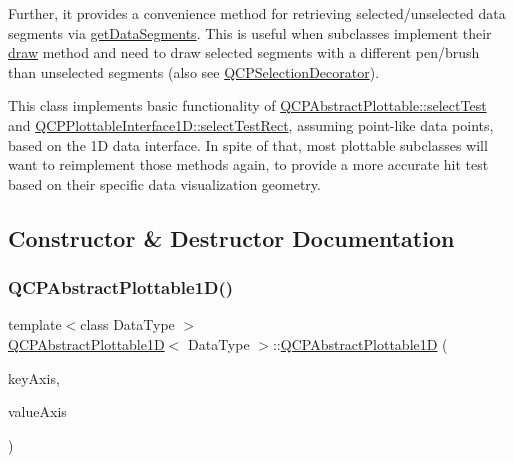 Further, it provides a convenience method for retrieving selected/unselected data segments via \mbox{\hyperlink{class_q_c_p_abstract_plottable1_d_ae890e62ce403c54f575c73b9529f1af8}{get\+Data\+Segments}}. This is useful when subclasses implement their \mbox{\hyperlink{class_q_c_p_abstract_plottable_a453f676a5cee7bf846c5f0fa05ea84b3}{draw}} method and need to draw selected segments with a different pen/brush than unselected segments (also see \mbox{\hyperlink{class_q_c_p_selection_decorator}{Q\+C\+P\+Selection\+Decorator}}).

This class implements basic functionality of \mbox{\hyperlink{class_q_c_p_abstract_plottable_addb3f5c41f007a78c3e142cc605bc712}{Q\+C\+P\+Abstract\+Plottable\+::select\+Test}} and \mbox{\hyperlink{class_q_c_p_plottable_interface1_d_a67093e4ccf490ff5f7750640941ff34c}{Q\+C\+P\+Plottable\+Interface1\+D\+::select\+Test\+Rect}}, assuming point-\/like data points, based on the 1D data interface. In spite of that, most plottable subclasses will want to reimplement those methods again, to provide a more accurate hit test based on their specific data visualization geometry. 

\subsection{Constructor \& Destructor Documentation}
\mbox{\label{class_q_c_p_abstract_plottable1_d_a30b2e50ab0afce65f104ea7a95440315}} 
\subsubsection{\texorpdfstring{QCPAbstractPlottable1D()}{QCPAbstractPlottable1D()}}
{\footnotesize\ttfamily template$<$class Data\+Type $>$ \\
\mbox{\hyperlink{class_q_c_p_abstract_plottable1_d}{Q\+C\+P\+Abstract\+Plottable1D}}$<$ Data\+Type $>$\+::\mbox{\hyperlink{class_q_c_p_abstract_plottable1_d}{Q\+C\+P\+Abstract\+Plottable1D}} (\begin{DoxyParamCaption}\item[{\mbox{\hyperlink{class_q_c_p_axis}{Q\+C\+P\+Axis}} $\ast$}]{key\+Axis,  }\item[{\mbox{\hyperlink{class_q_c_p_axis}{Q\+C\+P\+Axis}} $\ast$}]{value\+Axis }\end{DoxyParamCaption})}


